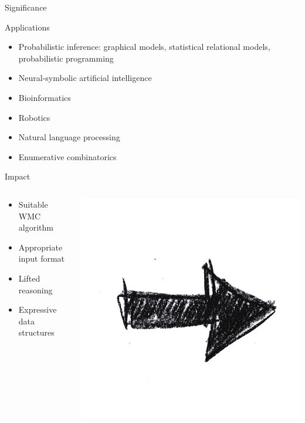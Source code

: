 \documentclass{beamer}
\begin{document}
\begin{frame}{Significance}
  \begin{block}{Applications}
  \begin{itemize}
    \item Probabilistic inference: graphical models, statistical relational models, probabilistic programming
    \item Neural-symbolic artificial intelligence
    \item Bioinformatics
    \item Robotics
    \item Natural language processing
    \item Enumerative combinatorics
  \end{itemize}
  \end{block}
  \begin{block}{Impact}
    \begin{columns}
      \begin{column}{0.50\textwidth}
        \begin{itemize}
          \item Suitable WMC algorithm
          \item Appropriate input format
          \item Lifted reasoning
          \item Expressive data structures
        \end{itemize}
      \end{column}
      \begin{column}{0.1\textwidth}
        \centering
        \includegraphics[width=\textwidth]{arrow.png}

\end{column}
\end{columns}
\end{block}
\end{frame}
\end{document}
